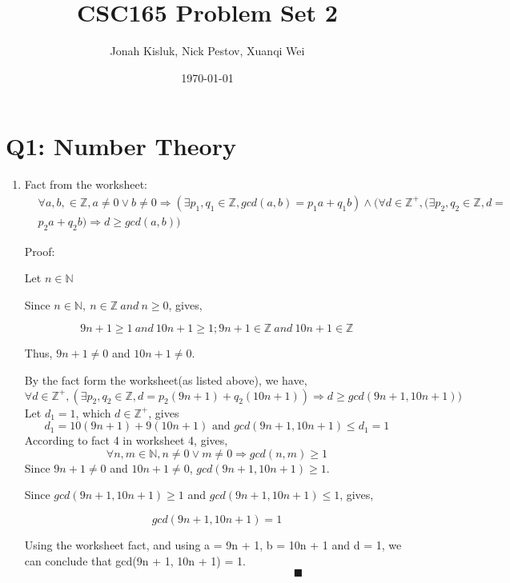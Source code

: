 \documentclass[12pt]{article}
\title{CSC165 Problem Set 2}
\author{Jonah Kisluk, Nick Pestov, Xuanqi Wei}
\date{\today}
\begin{document}
\maketitle
\thispagestyle{empty}

\newpage

\tableofcontents
\thispagestyle{empty}

\newpage

\setcounter{page}{1}

\section{Q1: Number Theory}
\begin{enumerate}[label=(\alph*)]
	\item Fact from the worksheet:
\begin{align*}
	&\forall a, b, \in \mathbb{Z}, a \neq 0 \lor b \neq 0 \Rightarrow (\exists p_1, q_1 \in \mathbb{Z}, gcd(a, b) = p_1a + q_1b) \wedge (\forall d \in \mathbb{Z^+}, (\exists p_2, q_2 \in \mathbb{Z}, d = \\
	&p_2a+q_2b)\Rightarrow d \geq gcd(a, b))
\end{align*}

Proof:

Let $n \in \mathbb{N}$

Since $n \in \mathbb{N},\ n\in \mathbb{Z}\ and\ n\geq 0$, gives, 

$$9n+1 \geq 1\ and\ 10n+1\geq 1; 9n+1\in \mathbb{Z}\ and\ 10n+1 \in \mathbb{Z}$$

Thus, $9n+1 \neq 0$ and $10n+1 \neq 0$.

By the fact form the worksheet(as listed above), we have,
$$\forall d \in \mathbb{Z^+}, (\exists p_2, q_2 \in \mathbb{Z}, d = p_2(9n+1)+q_2(10n+1))\Rightarrow d \geq gcd(9n+1, 10n+1))$$
Let $d_1 = 1$, which $d \in \mathbb{Z^+}$, gives
$$ d_1 = 10(9n+1)+9(10n+1) \text{ and } gcd(9n+1, 10n+1) \leq d_1 = 1$$
According to fact 4 in worksheet 4, gives, 
$$\forall n, m \in \mathbb{N}, n\neq 0 \vee m \neq 0 \Rightarrow gcd(n, m) \geq 1 $$
Since $9n+1 \neq 0$ and $10n+1 \neq 0$, $gcd(9n+1, 10n+1) \geq 1$.

Since $gcd(9n+1, 10n+1) \geq 1$ and $gcd(9n+1, 10n+1) \leq 1$, gives,

$$gcd(9n+1, 10n+1) = 1$$

Using the worksheet fact, and using a = 9n + 1, b = 10n + 1 and d = 1, we can conclude that gcd(9n + 1, 10n + 1) = 1. $\quad \quad \quad \quad \quad \quad \quad \quad \quad \quad \quad \quad \quad \quad \quad \quad \quad \quad \quad \quad \quad \quad \quad \quad \blacksquare $



\end{enumerate}
\end{document}
